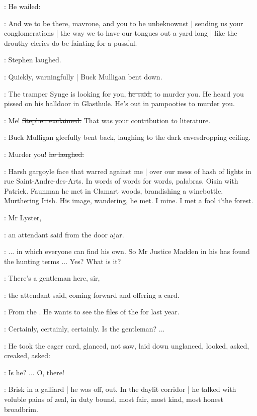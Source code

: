 :
He wailed:

\mulligan:
And we to be there,
mavrone,
and you to be unbeknownst |
sending us your conglomerations |
the way we to have our tongues out a yard long |
like the drouthy clerics do be fainting for a pussful.

:
Stephen laughed.

:
Quickly, warningfully |
Buck Mulligan bent down.

\mulligan:
The tramper Synge is looking for you,
\sout{he said,}
to murder you.
He heard you pissed on his halldoor in Glasthule.
He's out in pampooties to murder you.

\Stephen:
Me!
\sout{Stephen exclaimed.}
That was your contribution to literature.

:
Buck Mulligan gleefully bent back,
laughing to the dark eavesdropping ceiling.

\mulligan:
Murder you!
\sout{he laughed.}

\StephenInt:
Harsh gargoyle face that warred against me |
over our mess of hash of lights in rue Saint-Andre-des-Arts.
In words of words for words,
palabras.
Oisin with Patrick.
Faunman he met in Clamart woods,
brandishing a winebottle.
Murthering Irish.
His image,
wandering,
he met.
I mine.
I met a fool i'the forest.

\attendant:
Mr Lyster,

:
an attendant said from the door ajar.

\librarian:
... in which everyone can find his own.
So Mr Justice Madden in his 
has found the hunting terms ...
Yes?
What is it?

\attendant:
There's a gentleman here,
sir,

:
the attendant said,
coming forward and offering a card.

\attendant:
From the .
He wants to see the files of the  for last year.

\librarian:
Certainly,
certainly,
certainly.
Is the gentleman? ...

:
He took the eager card,
glanced,
not saw,
laid down unglanced,
looked,
asked,
creaked,
asked:

\librarian:
Is he? ...
O, there!

:
Brisk in a galliard |
he was off, out.
In the daylit corridor |
he talked with voluble pains of zeal,
in duty bound,
most fair,
most kind,
most honest broadbrim.

